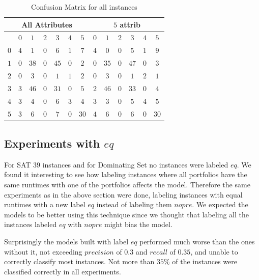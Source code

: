 \begin{table}[h]
	\center
	\begin{tabular}{|c|cccccc|cccccc|}
		\hline\multicolumn{7}{|c|}{All Attributes} &\multicolumn{6}{|c|}{$5$ attrib}\\
	\hline &$0$&$1$&$2$&$3$&$4$&$5$&$0$&$1$&$2$&$3$&$4$&$5$\\
\hline$0$&$4$&$1$&$0$&$6$&$1$&$7$&$4$&$0$&$0$&$5$&$1$&$9$\\
$1$&$0$&$38$&$0$&$45$&$0$&$2$&$0$&$35$&$0$&$47$&$0$&$3$\\
$2$&$0$&$3$&$0$&$1$&$1$&$2$&$0$&$3$&$0$&$1$&$2$&$1$\\
$3$&$3$&$46$&$0$&$31$&$0$&$5$&$2$&$46$&$0$&$33$&$0$&$4$\\
$4$&$3$&$4$&$0$&$6$&$3$&$4$&$3$&$3$&$0$&$5$&$4$&$5$\\
$5$&$3$&$6$&$0$&$7$&$0$&$30$&$4$&$6$&$0$&$6$&$0$&$30$\\
\hline
	\end{tabular}
	\caption{Confusion Matrix for all instances}
	\label{tbl:cmbCM}
\end{table}


\subsection{Experiments with \inline$eq$}
For SAT $39$ instances and for Dominating Set no instances were labeled \inline$eq$. We found it interesting to see how labeling instances where all portfolios have the same runtimes with one of the portfolios affects the model. Therefore the same experiments as in the above section were done, labeling instances with equal runtimes with a new label \inline$eq$ instead of labeling them \inline$nopre$. We expected the models to be better using this technique since we thought that labeling all the instances labeled \inline$eq$ with \inline$nopre$ might bias the model.

Surprisingly the models built with label \inline$eq$ performed much worse than the ones without it, not exceeding $precision$ of $0.3$ and $recall$ of $0.35$, and unable to correctly classify most instances. Not more than $35\%$ of the instances were classified correctly in all experiments.


